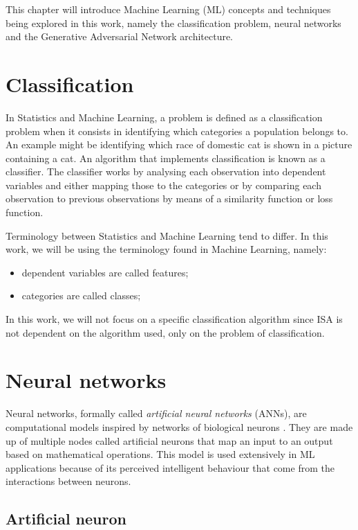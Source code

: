 
This chapter will introduce Machine Learning (ML) concepts and techniques being explored in this work, namely the classification problem, neural networks and the Generative Adversarial Network architecture.

\section{Classification}

In Statistics and Machine Learning, a problem is defined as a classification problem when it consists in identifying which categories a population belongs to. An example might be identifying which race of domestic cat is shown in a picture containing a cat. An algorithm that implements classification is known as a classifier. The classifier works by analysing each observation into dependent variables and either mapping those to the categories or by comparing each observation to previous observations by means of a similarity function or loss function. 

Terminology between Statistics and Machine Learning tend to differ. In this work, we will be using the terminology found in Machine Learning, namely:

\begin{itemize}
	\item dependent variables are called features;
	\item categories are called classes;
\end{itemize}

In this work, we will not focus on a specific classification algorithm since ISA is not dependent on the algorithm used, only on the problem of classification.

\section{Neural networks}

Neural networks, formally called \emph{artificial neural networks} (ANNs), are computational models inspired by networks of biological neurons \cite{Puri2016}. They are made up of multiple nodes called artificial neurons that map an input to an output based on mathematical operations. This model is used extensively in ML applications because of its perceived intelligent behaviour that come from the interactions between neurons.

\subsection{Artificial neuron}

